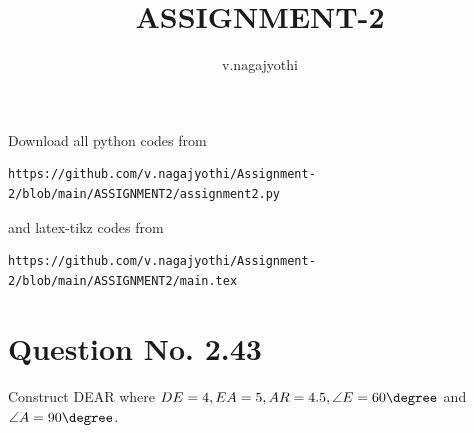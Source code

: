 \documentclass[journal,12pt,twocolumn]{IEEEtran}
\begin{document}
     \def\centbox#1{\makebox[0in]{#1}}
     \def\topbox#1{\raisebox{-\baselineskip}[0in][0in]{#1}}
     \def\midbox#1{\raisebox{-0.5\baselineskip}[0in][0in]{#1}}
\vspace{3cm}
\title{ASSIGNMENT-2}
\author{v.nagajyothi}
\maketitle
\newpage
\bigskip
\renewcommand{\thefigure}{\theenumi}
\renewcommand{\thetable}{\theenumi}
Download all python codes from 
\begin{lstlisting}
https://github.com/v.nagajyothi/Assignment-2/blob/main/ASSIGNMENT2/assignment2.py
\end{lstlisting}
%
and latex-tikz codes from 
%
\begin{lstlisting}
https://github.com/v.nagajyothi/Assignment-2/blob/main/ASSIGNMENT2/main.tex
\end{lstlisting}
%
\section{Question No. 2.43}
Construct DEAR where $DE = 4, EA =5, AR = 4.5, \angle E = 60 \degree$ and $\angle A = 90 \degree$.
%
\end{document}
